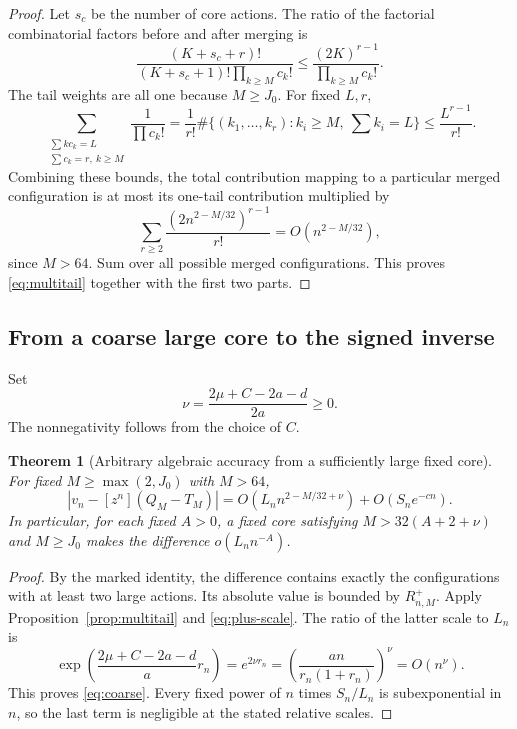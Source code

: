 \documentclass[11pt,a4paper]{article}
\numberwithin{equation}{section}
\newtheorem{theorem}{Theorem}[section]
\theoremstyle{definition}
\theoremstyle{remark}
\begin{document}
\begin{proof}
Let $s_c$ be the number of core actions. The ratio of the factorial
combinatorial factors before and after merging is
\[
 \frac{(K+s_c+r)!}{(K+s_c+1)!\prod_{k\ge M}c_k!}
 \le\frac{(2K)^{r-1}}{\prod_{k\ge M}c_k!}.
\]
The tail weights are all one because $M\ge J_0$. For fixed $L,r$,
\[
 \sum_{\substack{\sum k c_k=L\\\sum c_k=r,\ k\ge M}}
       \frac1{\prod c_k!}
 =\frac1{r!}\#\{(k_1,\ldots,k_r):k_i\ge M,\ \sum k_i=L\}
 \le\frac{L^{r-1}}{r!}.
\]
Combining these bounds, the total contribution mapping to a particular
merged configuration is at most its one-tail contribution multiplied by
\[
 \sum_{r\ge2}\frac{(2n^{2-M/32})^{r-1}}{r!}
 =O(n^{2-M/32}),
\]
since $M>64$. Sum over all possible merged configurations. This proves
\eqref{eq:multitail} together with the first two parts.
\end{proof}

\subsection{From a coarse large core to the signed inverse}

Set
\begin{equation}
 \nu=\frac{2\mu+C-2a-d}{2a}\ge0.
 \label{eq:nu}
\end{equation}
The nonnegativity follows from the choice of $C$.

\begin{theorem}[Arbitrary algebraic accuracy from a sufficiently large fixed core]
\label{thm:coarse}
For fixed $M\ge\max(2,J_0)$ with $M>64$,
\begin{equation}
 \left|v_n-[z^n](Q_M-T_M)\right|
 =O\!\left(L_n n^{2-M/32+\nu}\right)+O(S_ne^{-cn}).
 \label{eq:coarse}
\end{equation}
In particular, for each fixed $A>0$, a fixed core satisfying
$M>32(A+2+\nu)$ and $M\ge J_0$ makes the difference $o(L_n n^{-A})$.
\end{theorem}

\begin{proof}
By the marked identity, the difference contains exactly the configurations
with at least two large actions. Its absolute value is bounded by
$R_{n,M}^+$. Apply Proposition~\ref{prop:multitail} and
\eqref{eq:plus-scale}. The ratio of the latter scale to $L_n$ is
\[
 \exp\!\left(\frac{2\mu+C-2a-d}{a}r_n\right)
 =e^{2\nu r_n}
 =\left(\frac{an}{r_n(1+r_n)}\right)^\nu=O(n^\nu).
\]
This proves \eqref{eq:coarse}. Every fixed power of $n$ times
$S_n/L_n$ is subexponential in $n$, so the last term is negligible at the
stated relative scales.
\end{proof}
\end{document}
